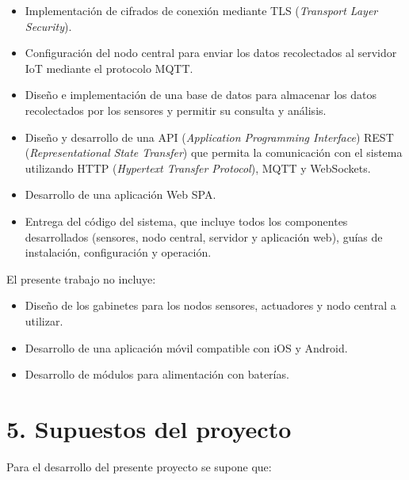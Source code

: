 \documentclass[
11pt, %
codirector, %
]{charter}
\begin{document}
\begin{itemize}
	\item Implementación de cifrados de conexión mediante TLS (\textit{Transport Layer Security}).
	\item Configuración del nodo central para enviar los datos recolectados al servidor IoT mediante el protocolo MQTT.
	\item Diseño e implementación de una base de datos para almacenar los datos recolectados por los sensores y permitir su consulta y análisis.
	\item Diseño y desarrollo de una API (\textit{Application Programming Interface}) REST (\textit{Representational State Transfer}) que permita la comunicación
	      con el sistema utilizando HTTP (\textit{Hypertext Transfer Protocol}), MQTT y WebSockets.
	\item Desarrollo de una aplicación Web SPA.
	\item Entrega del código del sistema, que incluye todos los componentes desarrollados (sensores, nodo central, servidor
	      y aplicación web), guías de instalación, configuración y operación.
\end{itemize}

El presente trabajo no incluye:
\begin{itemize}
	\item Diseño de los gabinetes para los nodos sensores, actuadores y nodo central a utilizar.
	\item Desarrollo de una aplicación móvil compatible con iOS y Android.
	\item Desarrollo de módulos para alimentación con baterías.
\end{itemize}



\section{5. Supuestos del proyecto}
\label{sec:supuestos}

Para el desarrollo del presente proyecto se supone que:
\end{document}

